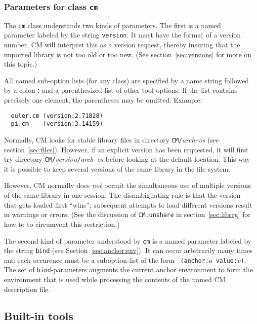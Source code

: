 \documentclass[titlepage,letterpaper]{article}
\begin{document}
\subsubsection*{Parameters for class {\tt cm}}

The {\tt cm} class understands two kinds of parameters.  The first is
a named parameter labeled by the string {\tt version}.  It must have
the format of a version number.  CM will interpret this as a version
request, thereby insuring that the imported library is not too old or
too new. (See section~\ref{sec:versions} for more on this topic.)

All named sub-option lists (for any class) are specified by a name
string followed by a colon {\bf :} and a parenthesized list of other
tool options.  If the list contains precisely one element, the
parentheses may be omitted.  Example:

\begin{verbatim}
  euler.cm (version:2.71828)
  pi.cm    (version:3.14159)
\end{verbatim}

Normally, CM looks for stable library files in directory
{\tt CM/}{\it arch}{\tt -}{\it os} (see section~\ref{sec:files}).
However, if an explicit version has been requested, it will first try
directory {\tt CM/}{\it version}{\tt /}{\it arch}{\tt -}{\it os}
before looking at the default location.  This way it is possible to
keep several versions of the same library in the file system.

However, CM normally does {\em not} permit the simultaneous use of
multiple versions of the same library in one session.  The
disambiguating rule is that the version that gets loaded first
``wins''; subsequent attempts to load different versions result in
warnings or errors.  (See the discussion of {\tt CM.unshare} in
section~\ref{sec:libreg} for how to to circumvent this restriction.)

The second kind of parameter understood by {\tt cm} is a named
parameter labeled by the string {\tt bind} (see
Section~\ref{sec:anchor:env}).  It can occur arbitrarily many times
and each occurence must be a suboption-list of the form {\tt
(anchor:$a$ value:$v$)}.  The set of {\tt bind}-parameters augments
the current anchor environment to form the environment that is used
while processing the contents of the named CM description file.

\subsection{Built-in tools}
\label{sec:builtin-tools}
\end{document}
